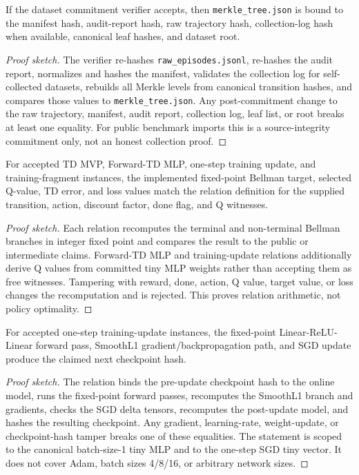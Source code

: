 \begin{theorem}
\label{thm:dataset-commitment}
If the dataset commitment verifier accepts, then \texttt{merkle\_tree.json} is
bound to the manifest hash, audit-report hash, raw trajectory hash,
collection-log hash when available, canonical leaf hashes, and dataset root.
\end{theorem}
\begin{proof}[Proof sketch]
The verifier re-hashes \texttt{raw\_episodes.jsonl}, re-hashes the audit
report, normalizes and hashes the manifest, validates the collection log for
self-collected datasets, rebuilds all Merkle levels from canonical transition
hashes, and compares those values to \texttt{merkle\_tree.json}.  Any
post-commitment change to the raw trajectory, manifest, audit report,
collection log, leaf list, or root breaks at least one equality.  For public
benchmark imports this is a source-integrity commitment only, not an honest
collection proof.
\end{proof}

\begin{theorem}
\label{thm:bellman-target}
For accepted TD MVP, Forward-TD MLP, one-step training update, and
training-fragment instances, the implemented fixed-point Bellman target,
selected Q-value, TD error, and loss values match the relation definition for
the supplied transition, action, discount factor, done flag, and Q witnesses.
\end{theorem}
\begin{proof}[Proof sketch]
Each relation recomputes the terminal and non-terminal Bellman branches in
integer fixed point and compares the result to the public or intermediate
claims.  Forward-TD MLP and training-update relations additionally derive Q
values from committed tiny MLP weights rather than accepting them as free
witnesses.  Tampering with reward, done, action, Q value, target value, or loss
changes the recomputation and is rejected.  This proves relation arithmetic,
not policy optimality.
\end{proof}

\begin{theorem}
\label{thm:update-correctness}
For accepted one-step training-update instances, the fixed-point
Linear-ReLU-Linear forward pass, SmoothL1 gradient/backpropagation path, and
SGD update produce the claimed next checkpoint hash.
\end{theorem}
\begin{proof}[Proof sketch]
The relation binds the pre-update checkpoint hash to the online model, runs the
fixed-point forward passes, recomputes the SmoothL1 branch and gradients,
checks the SGD delta tensors, recomputes the post-update model, and hashes the
resulting checkpoint.  Any gradient, learning-rate, weight-update, or
checkpoint-hash tamper breaks one of these equalities.  The statement is scoped
to the canonical batch-size-1 tiny MLP and to the one-step SGD tiny vector.  It
does not cover Adam, batch sizes 4/8/16, or arbitrary network sizes.
\end{proof}

